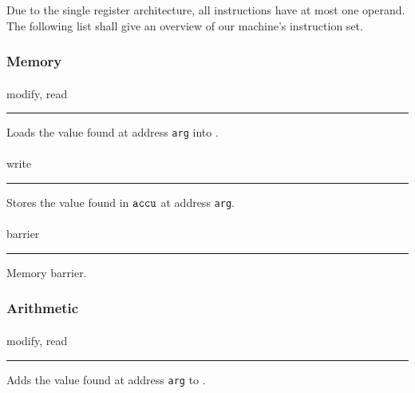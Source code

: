 Due to the single register architecture, all instructions have at most one operand.
The following list shall give an overview of our machine's instruction set.

\newcommand{\defop}[3]{
  \paragraph{#1} \hfill #2
  \rule[0.5\baselineskip]{\textwidth}{0.1pt}\vspace{-0.5\baselineskip}\par\noindent
  #3
}


\subsubsection*{Memory}


\defop
{}
{modify, read}
{Loads the value found at address \texttt{arg} into \ACCU.}

\defop
{}
{write}
{Stores the value found in $\texttt{accu}$ at address \texttt{arg}.}

\defop
{}
{barrier}
{Memory barrier.}

\subsubsection*{Arithmetic}


\defop
{}
{modify, read}
{Adds the value found at address \texttt{arg} to \ACCU.}

